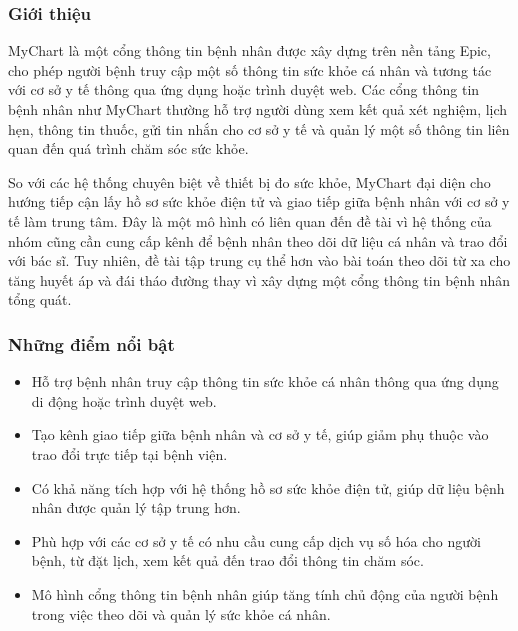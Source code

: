 \subsubsection{Giới thiệu}
\par MyChart là một cổng thông tin bệnh nhân được xây dựng trên nền tảng Epic, cho phép người bệnh truy cập một số thông tin sức khỏe cá nhân và tương tác với cơ sở y tế thông qua ứng dụng hoặc trình duyệt web. Các cổng thông tin bệnh nhân như MyChart thường hỗ trợ người dùng xem kết quả xét nghiệm, lịch hẹn, thông tin thuốc, gửi tin nhắn cho cơ sở y tế và quản lý một số thông tin liên quan đến quá trình chăm sóc sức khỏe. \cite{mychartFeatures}

\par So với các hệ thống chuyên biệt về thiết bị đo sức khỏe, MyChart đại diện cho hướng tiếp cận lấy hồ sơ sức khỏe điện tử và giao tiếp giữa bệnh nhân với cơ sở y tế làm trung tâm. Đây là một mô hình có liên quan đến đề tài vì hệ thống của nhóm cũng cần cung cấp kênh để bệnh nhân theo dõi dữ liệu cá nhân và trao đổi với bác sĩ. Tuy nhiên, đề tài tập trung cụ thể hơn vào bài toán theo dõi từ xa cho tăng huyết áp và đái tháo đường thay vì xây dựng một cổng thông tin bệnh nhân tổng quát.

\subsubsection{Những điểm nổi bật}
\begin{itemize}
    \item Hỗ trợ bệnh nhân truy cập thông tin sức khỏe cá nhân thông qua ứng dụng di động hoặc trình duyệt web. \cite{mychartFeatures}
    \item Tạo kênh giao tiếp giữa bệnh nhân và cơ sở y tế, giúp giảm phụ thuộc vào trao đổi trực tiếp tại bệnh viện.
    \item Có khả năng tích hợp với hệ thống hồ sơ sức khỏe điện tử, giúp dữ liệu bệnh nhân được quản lý tập trung hơn.
    \item Phù hợp với các cơ sở y tế có nhu cầu cung cấp dịch vụ số hóa cho người bệnh, từ đặt lịch, xem kết quả đến trao đổi thông tin chăm sóc.
    \item Mô hình cổng thông tin bệnh nhân giúp tăng tính chủ động của người bệnh trong việc theo dõi và quản lý sức khỏe cá nhân.
\end{itemize}

